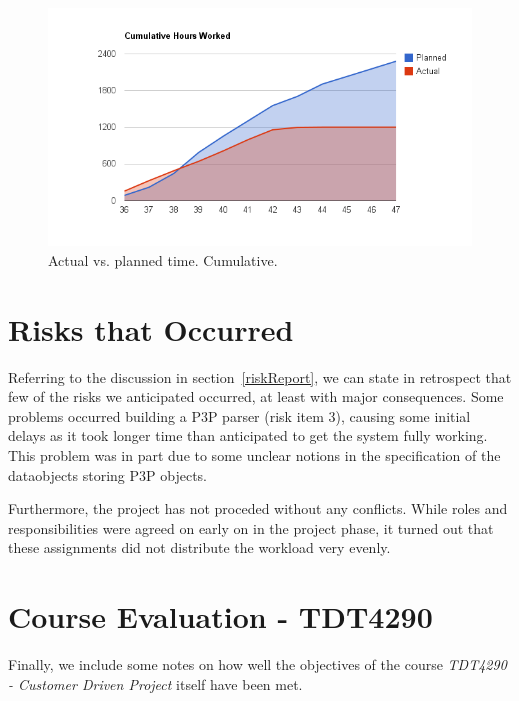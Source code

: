 \begin{centering}
  \begin{figure}
    \includegraphics[width = \textwidth]{Evaluation/actual_v_planned_cuml.png}
    \caption{Actual vs. planned time. Cumulative.}
    \label{actualPlannedCuml}
  \end{figure}
\end{centering}

\section{Risks that Occurred}

Referring to the discussion in section~\ref{riskReport}, we can state
in retrospect that few of the risks we anticipated occurred, at least
with major consequences. Some problems occurred building a P3P
parser (risk item 3), causing some initial delays as it took longer time than
anticipated to get the system fully working. This problem was in part
due to some unclear notions in the specification of the dataobjects
storing P3P objects.

Furthermore, the project has not proceded without any conflicts. While
roles and responsibilities were agreed on early on in the project
phase, it turned out that these assignments did not distribute the
workload very evenly.


\section{Course Evaluation - TDT4290}

Finally, we include some notes on how well the objectives of the
course \emph{TDT4290 - Customer Driven Project} itself have been met.